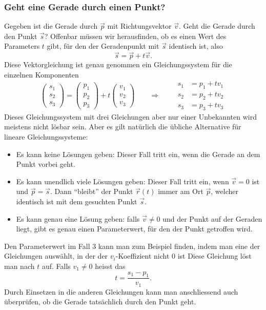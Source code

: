 \subsubsection{Geht eine Gerade durch einen Punkt?}
Gegeben ist die Gerade durch $\vec p$ mit Richtungsvektor $\vec v$.
Geht die
Gerade durch den Punkt $\vec s$? Offenbar müssen wir herausfinden, ob es
einen Wert des Parameters $t$ gibt, für den der Geradenpunkt mit $\vec s$
identisch ist, also
\[
\vec s = \vec p + t\vec v.
\]
Diese Vektorgleichung ist genau genommen ein Gleichungssystem für die einzelnen
Komponenten
\[
\begin{pmatrix}
s_1\\s_2\\s_3
\end{pmatrix}
=
\begin{pmatrix}
p_1\\p_2\\p_3
\end{pmatrix}
+t
\begin{pmatrix}
v_1\\v_2\\v_3
\end{pmatrix}
\qquad
\Rightarrow
\qquad
\begin{aligned}
s_1&=p_1+tv_1\\
s_2&=p_2+tv_2\\
s_3&=p_3+tv_3
\end{aligned}
\]
Dieses Gleichungssystem mit drei Gleichungen aber nur einer Unbekannten wird
meistens nicht lösbar sein.
Aber es gilt natürlich die übliche Alternative
für lineare Gleichungssysteme:
\begin{itemize}
\item Es kann keine Lösungen geben: Dieser Fall tritt ein, wenn die Gerade
an dem Punkt vorbei geht.
\item Es kann unendlich viele Lösungen geben: Dieser Fall tritt ein, wenn
$\vec v=0$ ist und $\vec p=\vec s$.
Dann ``bleibt'' der Punkt $\vec r(t)$
immer am Ort $\vec p$, welcher identisch ist mit dem gesuchten Punkt $\vec s$.
\item Es kann genau eine Lösung geben: falls $\vec v\ne 0$ und der Punkt auf der
Geraden liegt, gibt es genau einen Parameterwert, für den der Punkt
getroffen wird.
\end{itemize}
Den Parameterwert im Fall 3 kann man zum Beispiel finden, indem man eine
der Gleichungen auswählt, in der der $v_i$-Koeffizient nicht $0$ ist
Diese Gleichung löst man nach $t$ auf.
Falls $v_1\ne 0$ heisst das
\[
t=\frac{s_1-p_1}{v_1}.
\]
Durch Einsetzen in die anderen Gleichungen kann man anschliessend auch überprüfen,
ob die Gerade tatsächlich durch den Punkt geht.

